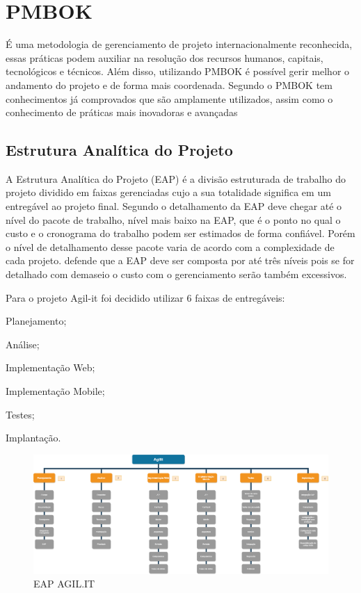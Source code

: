 \section{PMBOK}

{É uma metodologia de gerenciamento de projeto internacionalmente reconhecida, essas práticas podem auxiliar na resolução dos recursos humanos, capitais, tecnológicos e técnicos. Além disso, utilizando PMBOK é possível gerir melhor o andamento do projeto e de forma mais coordenada. Segundo \cite{PMG2018} o PMBOK tem conhecimentos já comprovados que são amplamente utilizados, assim como o conhecimento de práticas mais inovadoras e avançadas}

\subsection{Estrutura Analítica do Projeto}


{A Estrutura Analítica do Projeto (EAP) é a divisão estruturada de trabalho do projeto dividido em faixas gerenciadas cujo a sua totalidade significa em um entregável ao projeto final.
Segundo \cite{PMI2018} o detalhamento da EAP deve chegar até o nível do pacote de trabalho, nível mais baixo na EAP, que é o ponto no qual o custo e o cronograma do trabalho podem ser estimados de forma confiável. Porém o nível de detalhamento desse pacote varia de acordo com a complexidade de cada projeto. \cite{kerzner2017} defende que a EAP deve ser composta por até três níveis pois se for detalhado com demaseio o custo com o gerenciamento serão também excessivos.}

Para o projeto Agil-it foi decidido utilizar 6 faixas de entregáveis:

\begin{subalineas}
	\item {Planejamento};
	\item {Análise};
	\item {Implementação Web};
	\item {Implementação Mobile};
	\item {Testes};
	\item {Implantação}.
\end{subalineas}

\newpage
\begin{landscape}
\begin{figure}[htb]
	\caption{\label{EAP}EAP AGIL.IT}
	\begin{center}
		\includegraphics[scale=0.38]{./Figuras/EAP.png}
	\end{center}
\end{figure}
\end{landscape}

